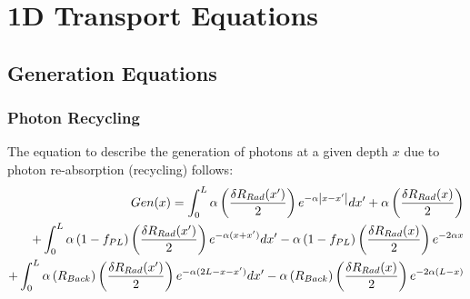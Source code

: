 \documentclass[11pt]{article}
\begin{document}
	
	\setcounter{page}{1}	
	
\section{1D Transport Equations}	
\subsection{Generation Equations}
\subsubsection*{Photon Recycling}
\par The equation to describe the generation of photons at a given depth $ x $ due to photon re-absorption (recycling) follows:
\begin{equation} \label{eq:Gen}
\begin{split}
	Gen(x) = \int_{0}^{L} \alpha \left(\frac{\delta R_{Rad}(x')}{2}\right) e^{-\alpha \abs{x-x'}} dx' + \alpha \left(\frac{\delta R_{Rad}(x)}{2}\right)\\
	+ \int_{0}^{L} \alpha \left(1-f_{PL}\right) \left(\frac{\delta R_{Rad}(x')}{2}\right) e^{-\alpha (x+x')} dx'
	- \alpha \left(1-f_{PL}\right) \left(\frac{\delta R_{Rad}(x)}{2}\right)  e^{-2\alpha x}\\
	+ \int_{0}^{L} \alpha \left(R_{Back}\right) \left(\frac{\delta R_{Rad}(x')}{2}\right) e^{-\alpha (2L-x-x')} dx'
	- \alpha \left(R_{Back}\right) \left(\frac{\delta R_{Rad}(x)}{2}\right)  e^{-2\alpha (L-x)}\\
\end{split}
\end{equation}
\end{document}
